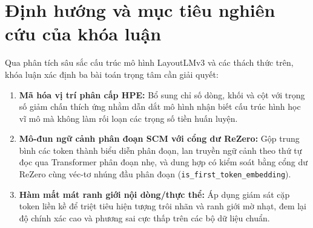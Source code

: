 \section{Định hướng và mục tiêu nghiên cứu của khóa luận}
Qua phân tích sâu sắc cấu trúc mô hình LayoutLMv3 và các thách thức trên, khóa luận xác định ba bài toán trọng tâm cần giải quyết:
\begin{enumerate}
    \item \textbf{Mã hóa vị trí phân cấp HPE:} Bổ sung chỉ số dòng, khối và cột với trọng số giảm chấn thích ứng nhằm dẫn dắt mô hình nhận biết cấu trúc hình học vĩ mô mà không làm rối loạn các trọng số tiền huấn luyện.
    \item \textbf{Mô-đun ngữ cảnh phân đoạn SCM với cổng dư ReZero:} Gộp trung bình các token thành biểu diễn phân đoạn, lan truyền ngữ cảnh theo thứ tự đọc qua Transformer phân đoạn nhẹ, và dung hợp có kiểm soát bằng cổng dư ReZero \cite{bachlechner2021rezero} cùng véc-tơ nhúng đầu phân đoạn (\texttt{is\_first\_token\_embedding}).
    \item \textbf{Hàm mất mát ranh giới nội dòng/thực thể:} Áp dụng giám sát cặp token liền kề để triệt tiêu hiện tượng trôi nhãn và ranh giới mờ nhạt, đem lại độ chính xác cao và phương sai cực thấp trên các bộ dữ liệu chuẩn.
\end{enumerate}

